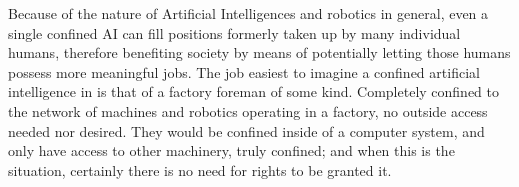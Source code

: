 Because of the nature of Artificial Intelligences and robotics in general, even a single confined AI can fill positions formerly taken up by many individual humans, therefore benefiting society by means of potentially letting those humans possess more meaningful jobs. The job easiest to imagine a confined artificial intelligence in is that of a factory foreman of some kind. Completely confined to the network of machines and robotics operating in a factory, no outside access needed nor desired. They would be confined inside of a computer system, and only have access to other machinery, truly confined; and when this is the situation, certainly there is no need for rights to be granted it.